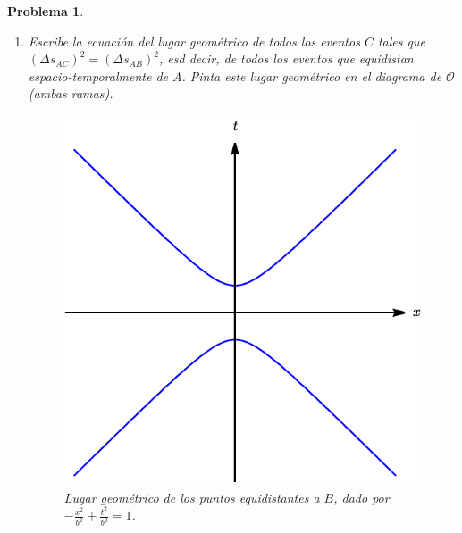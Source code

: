 \documentclass[12pt]{article}
\theoremstyle{break}
\newtheorem{exercise}{Problema}
\theoremstyle{nonumberbreak}
\newcommand*{\observer}{\mathcal{O}}
\begin{document}
\begin{exercise}
\begin{enumerate}[label = \alph*)]
            Por lo tanto, la separación entre los eventos es de tipo \ul{temporaloide}.

            \item Escribe la ecuación del lugar geométrico de todos los eventos \(C\) tales que \((\Delta s_{AC})^{2} = (\Delta s_{AB})^{2}\), esd decir, de todos los eventos que equidistan espacio-temporalmente de \(A\). Pinta este lugar geométrico en el diagrama de \(\observer\) (ambas ramas).
            
            \begin{figure}[htb]
                \centering
                \includegraphics{hyperbole.pdf}
                \caption{Lugar geométrico de los puntos equidistantes a \(B\), dado por \(-\frac{x^{2}}{b^{2}} + \frac{t^{2}}{b^{2}} = 1\).}
                \label{fig:hyperbole}
            \end{figure}


\end{enumerate}
\end{exercise}
\end{document}
